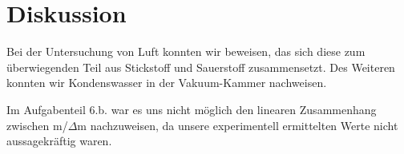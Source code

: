 \documentclass[10pt,a4paper]{article}
\begin{document}
\section{Diskussion}
Bei der Untersuchung von Luft konnten wir beweisen, das sich diese zum überwiegenden Teil aus Stickstoff und Sauerstoff zusammensetzt.
Des Weiteren konnten wir Kondenswasser in der Vakuum-Kammer nachweisen.

Im Aufgabenteil 6.b. war es uns nicht möglich den linearen Zusammenhang zwischen m/$\Delta$m nachzuweisen, da unsere experimentell ermittelten Werte nicht aussagekräftig waren. 
\end{document}

